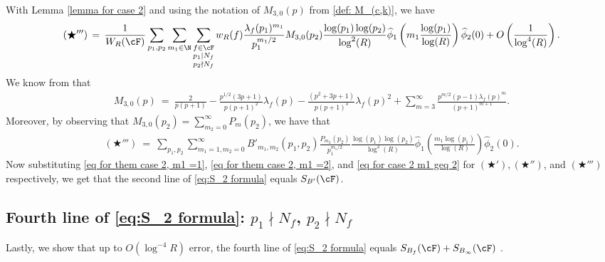 \documentclass[11pt, reqno]{amsart}
\theoremstyle{definition}
\theoremstyle{remark}
\numberwithin{equation}{section}
\renewcommand{\hat}{\widehat}
\begin{document}
With Lemma \ref{lemma for case 2} and using the notation of $M_{3,0}(p)$ from \eqref{def: M_(c,k)}, we have
\small{\begin{align*}
    (\bigstar''') \,=\, \frac{1}{W_R(\cF)}\sum_{p_1,p_2}\sum_{m_1\in \N}\sum_{\substack{f\in \cF\\p_1|N_f\\p_2\nmid N_f }}w_R(f)\frac{\lambda_f(p_1)^{m_1}}{p_1^{m_1/2}}M_{3,0}(p_2)\frac{\log(p_1)\log (p_2)}{\log^2(R)}\hat\phi_1 \left(m_1 \frac{\log(p_1)}{\log(R)}\right)\hat \phi_2 (0) + O\left(\frac{1}{\log^4(R)}\right).
\end{align*}}\normalsize We know from \cite{Miller2009_LOTerms_1LevelDensity}
 that \begin{align*}
     M_{3,0}(p)\ = \ \frac{2}{p(p+1)}-\frac{p^{1/2}(3p+1)}{p(p+1)^2}\lambda_f(p)-\frac{(p^2+3p+1)}{p(p+1)^3}\lambda_f(p)^2+\sum_{m=3}^{\infty}\frac{p^{m/2}(p-1)\lambda_f(p)^m}{(p+1)^{m+1}}.
 \end{align*}
Moreover, by observing that $M_{3,0}(p_2)=\sum_{m_2=0}^\infty P_m(p_2)$, we have that
\begin{align}
\label{eq for case 2 m1 geq 2}
(\bigstar''')\ = \ \sum_{p_1,p_2}\sum_{m_1=1,m_2=0}^{\infty}B'_{m_1,m_2}(p_1,p_2)\frac{P_{m_2}(p_2)}{p_1^{m_1/2}}\frac{\log(p_1)\log (p_2)}{\log^2(R)}\hat\phi_1\left(\frac{m_1\log(p_1)}{\log(R)}\right)\hat\phi_2\left(0\right).
\end{align} 
Now substituting \eqref{eq for them case 2, m1 =1}, \eqref{eq for them case 2, m1 =2}, and \eqref{eq for case 2 m1 geq 2} for $(\bigstar'),(\bigstar'')$, and $(\bigstar''')$ respectively, we get that the second line of \eqref{eq:S_2 formula} equals $S_{B'}(\cF)$.
 
\subsection{\texorpdfstring{Fourth line of \eqref{eq:S_2 formula}: $p_1 \nmid N_f$, $p_2 \nmid N_f$}{Fourth line of S2}}
Lastly, we show that up to $O(\log^{-4} R)$ error, the fourth line of \eqref{eq:S_2 formula} equals $S_{B_f}(\cF) +S_{B_\infty}(\cF) $  .
\end{document}
